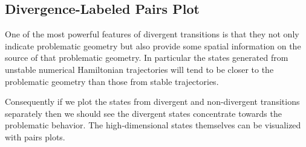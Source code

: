 \documentclass[
  letterpaper,
  DIV=11,
  numbers=noendperiod]{scrartcl}
\begin{document}
\hypertarget{divergence-labeled-pairs-plot}{%
\subsection{Divergence-Labeled Pairs
Plot}\label{divergence-labeled-pairs-plot}}

One of the most powerful features of divergent transitions is that they
not only indicate problematic geometry but also provide some spatial
information on the source of that problematic geometry. In particular
the states generated from unstable numerical Hamiltonian trajectories
will tend to be closer to the problematic geometry than those from
stable trajectories.

Consequently if we plot the states from divergent and non-divergent
transitions separately then we should see the divergent states
concentrate towards the problematic behavior. The high-dimensional
states themselves can be visualized with pairs plots.
\end{document}
